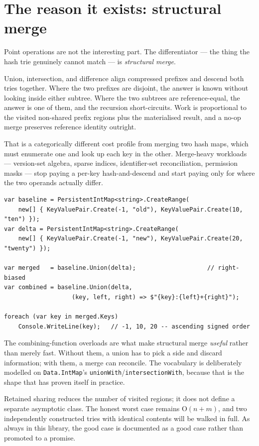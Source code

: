 \documentclass[11pt,twoside,openright]{book}
\newcommand{\code}[1]{\texorpdfstring{\textcolor{d7ink}{\texttt{#1}}}{#1}}
\newcommand{\term}[1]{\textit{#1}}
\newcommand{\bigoh}[1]{$\mathrm{O}(#1)$}
\begin{document}
\section{The reason it exists: structural merge}

Point operations are not the interesting part. The differentiator --- the thing
the hash trie genuinely cannot match --- is \term{structural merge}.

Union, intersection, and difference align compressed prefixes and descend both
tries together. Where the two prefixes are disjoint, the answer is known without
looking inside either subtree. Where the two subtrees are reference-equal, the
answer is one of them, and the recursion short-circuits. Work is proportional to
the visited non-shared prefix regions plus the materialised result, and a no-op
merge preserves reference identity outright.

That is a categorically different cost profile from merging two hash maps, which
must enumerate one and look up each key in the other. Merge-heavy workloads ---
version-set algebra, sparse indices, identifier-set reconciliation, permission
masks --- stop paying a per-key hash-and-descend and start paying only for
where the two operands actually differ.

\begin{lstlisting}[language={[Sharp]C}]
var baseline = PersistentIntMap<string>.CreateRange(
    new[] { KeyValuePair.Create(-1, "old"), KeyValuePair.Create(10, "ten") });
var delta = PersistentIntMap<string>.CreateRange(
    new[] { KeyValuePair.Create(-1, "new"), KeyValuePair.Create(20, "twenty") });

var merged   = baseline.Union(delta);                    // right-biased
var combined = baseline.Union(delta,
                   (key, left, right) => $"{key}:{left}+{right}");

foreach (var key in merged.Keys)
    Console.WriteLine(key);   // -1, 10, 20 -- ascending signed order
\end{lstlisting}

The combining-function overloads are what make structural merge \emph{useful}
rather than merely fast. Without them, a union has to pick a side and discard
information; with them, a merge can reconcile. The vocabulary is deliberately
modelled on \code{Data.IntMap}'s \code{unionWith}/\code{intersectionWith},
because that is the shape that has proven itself in practice.

\begin{caveatbox}
Retained sharing reduces the number of visited regions; it does not define a
separate asymptotic class. The honest worst case remains \bigoh{n+m}, and two
independently constructed tries with identical contents will be walked in full.
As always in this library, the good case is documented as a good case rather
than promoted to a promise.
\end{caveatbox}
\end{document}
